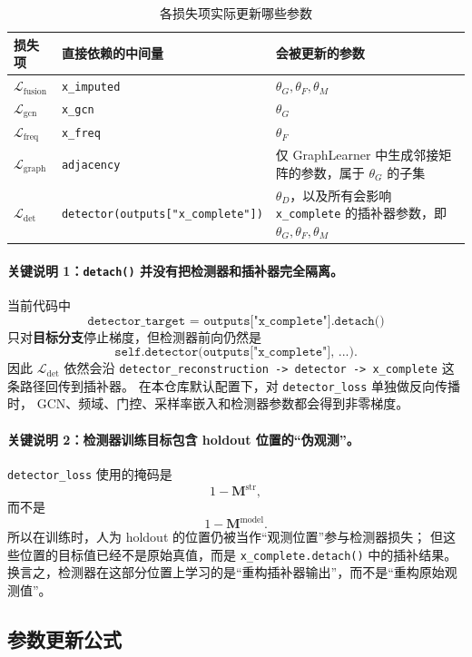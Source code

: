\documentclass[UTF8,11pt,a4paper]{ctexart}
\begin{document}
\begin{table}[H]
\centering
\caption{各损失项实际更新哪些参数}
\begin{tabularx}{\textwidth}{@{}l Y Y@{}}
\toprule
损失项 & 直接依赖的中间量 & 会被更新的参数 \\
\midrule
$\mathcal{L}_{\mathrm{fusion}}$ &
\texttt{x\_imputed} &
$\theta_G,\theta_F,\theta_M$ \\
$\mathcal{L}_{\mathrm{gcn}}$ &
\texttt{x\_gcn} &
$\theta_G$ \\
$\mathcal{L}_{\mathrm{freq}}$ &
\texttt{x\_freq} &
$\theta_F$ \\
$\mathcal{L}_{\mathrm{graph}}$ &
\texttt{adjacency} &
仅 GraphLearner 中生成邻接矩阵的参数，属于 $\theta_G$ 的子集 \\
$\mathcal{L}_{\mathrm{det}}$ &
\texttt{detector(outputs["x\_complete"])} &
$\theta_D$，以及所有会影响 \texttt{x\_complete} 的插补器参数，即 $\theta_G,\theta_F,\theta_M$ \\
\bottomrule
\end{tabularx}
\end{table}

\paragraph{关键说明 1：\texttt{detach()} 并没有把检测器和插补器完全隔离。}
当前代码中
\[
\texttt{detector\_target = outputs["x\_complete"].detach()}
\]
只对\textbf{目标分支}停止梯度，但检测器前向仍然是
\[
\texttt{self.detector(outputs["x\_complete"], ...)}.
\]
因此 $\mathcal{L}_{\mathrm{det}}$ 依然会沿
\texttt{detector\_reconstruction -> detector -> x\_complete}
这条路径回传到插补器。
在本仓库默认配置下，对 \texttt{detector\_loss} 单独做反向传播时，
GCN、频域、门控、采样率嵌入和检测器参数都会得到非零梯度。

\paragraph{关键说明 2：检测器训练目标包含 holdout 位置的“伪观测”。}
\texttt{detector\_loss} 使用的掩码是
\[
1-\bm{M}^{\mathrm{str}},
\]
而不是
\[
1-\bm{M}^{\mathrm{model}}.
\]
所以在训练时，人为 holdout 的位置仍被当作“观测位置”参与检测器损失；
但这些位置的目标值已经不是原始真值，而是
\texttt{x\_complete.detach()} 中的插补结果。
换言之，检测器在这部分位置上学习的是“重构插补器输出”，而不是“重构原始观测值”。

\subsection{参数更新公式}
\end{document}

